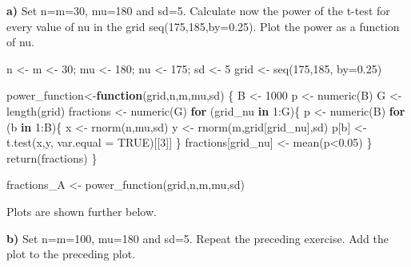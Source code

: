\documentclass[
]{article}
\newenvironment{Shaded}{\begin{snugshade}}{\end{snugshade}}
\newcommand{\AttributeTok}[1]{\textcolor[rgb]{0.77,0.63,0.00}{#1}}
\newcommand{\ConstantTok}[1]{\textcolor[rgb]{0.00,0.00,0.00}{#1}}
\newcommand{\ControlFlowTok}[1]{\textcolor[rgb]{0.13,0.29,0.53}{\textbf{#1}}}
\newcommand{\DecValTok}[1]{\textcolor[rgb]{0.00,0.00,0.81}{#1}}
\newcommand{\FloatTok}[1]{\textcolor[rgb]{0.00,0.00,0.81}{#1}}
\newcommand{\FunctionTok}[1]{\textcolor[rgb]{0.00,0.00,0.00}{#1}}
\newcommand{\NormalTok}[1]{#1}
\newcommand{\OtherTok}[1]{\textcolor[rgb]{0.56,0.35,0.01}{#1}}
\newcommand{\SpecialCharTok}[1]{\textcolor[rgb]{0.00,0.00,0.00}{#1}}
\begin{document}
\textbf{a)} Set n=m=30, mu=180 and sd=5. Calculate now the power of the
t-test for every value of nu in the grid seq(175,185,by=0.25). Plot the
power as a function of nu.

\begin{Shaded}
\begin{Highlighting}[]
\NormalTok{n }\OtherTok{\textless{}{-}}\NormalTok{ m }\OtherTok{\textless{}{-}} \DecValTok{30}\NormalTok{; mu }\OtherTok{\textless{}{-}} \DecValTok{180}\NormalTok{; nu }\OtherTok{\textless{}{-}} \DecValTok{175}\NormalTok{; sd }\OtherTok{\textless{}{-}} \DecValTok{5}
\NormalTok{grid }\OtherTok{\textless{}{-}} \FunctionTok{seq}\NormalTok{(}\DecValTok{175}\NormalTok{,}\DecValTok{185}\NormalTok{, }\AttributeTok{by=}\FloatTok{0.25}\NormalTok{)}

\NormalTok{power\_function}\OtherTok{\textless{}{-}}\ControlFlowTok{function}\NormalTok{(grid,n,m,mu,sd) \{}
\NormalTok{  B }\OtherTok{\textless{}{-}} \DecValTok{1000}
\NormalTok{  p }\OtherTok{\textless{}{-}} \FunctionTok{numeric}\NormalTok{(B)}
\NormalTok{  G }\OtherTok{\textless{}{-}} \FunctionTok{length}\NormalTok{(grid)}
\NormalTok{  fractions }\OtherTok{\textless{}{-}} \FunctionTok{numeric}\NormalTok{(G)}
  \ControlFlowTok{for}\NormalTok{ (grid\_nu }\ControlFlowTok{in} \DecValTok{1}\SpecialCharTok{:}\NormalTok{G)\{}
\NormalTok{    p }\OtherTok{\textless{}{-}} \FunctionTok{numeric}\NormalTok{(B)}
    \ControlFlowTok{for}\NormalTok{ (b }\ControlFlowTok{in} \DecValTok{1}\SpecialCharTok{:}\NormalTok{B)\{}
\NormalTok{      x }\OtherTok{\textless{}{-}} \FunctionTok{rnorm}\NormalTok{(n,mu,sd)}
\NormalTok{      y }\OtherTok{\textless{}{-}} \FunctionTok{rnorm}\NormalTok{(m,grid[grid\_nu],sd)}
\NormalTok{      p[b] }\OtherTok{\textless{}{-}} \FunctionTok{t.test}\NormalTok{(x,y, }\AttributeTok{var.equal =} \ConstantTok{TRUE}\NormalTok{)[[}\DecValTok{3}\NormalTok{]]}
\NormalTok{    \}}
\NormalTok{    fractions[grid\_nu] }\OtherTok{\textless{}{-}} \FunctionTok{mean}\NormalTok{(p}\SpecialCharTok{\textless{}}\FloatTok{0.05}\NormalTok{)}
\NormalTok{  \}}
  \FunctionTok{return}\NormalTok{(fractions)}
\NormalTok{\}}

\NormalTok{fractions\_A }\OtherTok{\textless{}{-}} \FunctionTok{power\_function}\NormalTok{(grid,n,m,mu,sd)}
\end{Highlighting}
\end{Shaded}

Plots are shown further below.

\textbf{b)} Set n=m=100, mu=180 and sd=5. Repeat the preceding exercise.
Add the plot to the preceding plot.
\end{document}

